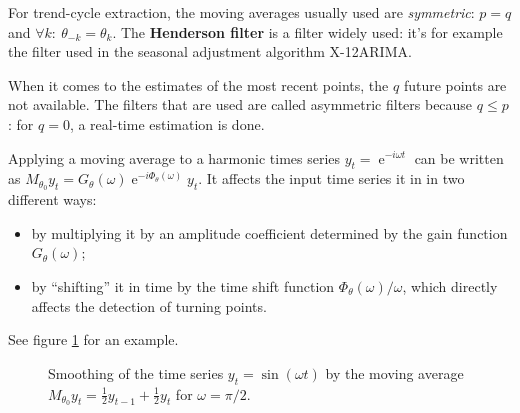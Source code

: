 \documentclass[12pt,,a4paper]{article}
\DeclareMathOperator{\e}{e}
\begin{document}
For trend-cycle extraction, the moving averages usually used are \emph{symmetric}: \(p=q\) and \(\forall k:\:\theta_{-k} = \theta_k\).
The \textbf{Henderson filter} is a filter widely used: it's for example the filter used in the seasonal adjustment algorithm X-12ARIMA.

When it comes to the estimates of the most recent points, the \(q\) future points are not available.
The filters that are used are called asymmetric filters because \(q\leq p\): for \(q=0\), a real-time estimation is done.

Applying a moving average to a harmonic times series \(y_t=\e^{-i\omega t}\) can be written as \(M_{\theta_0}y_t=G_\theta(\omega)\e^{-i\Phi_\theta(\omega)}y_t\). It affects the input time series it in in two different ways:

\begin{itemize}
\item
  by multiplying it by an amplitude coefficient determined by the gain function \(G_{\theta}\left(\omega\right)\);
\item
  by ``shifting'' it in time by the time shift function \(\Phi_\theta(\omega)/\omega\), which directly affects the detection of turning points.
\end{itemize}

See figure \ref{fig:exgainPhase} for an example.

\begin{figure}[!ht]
\caption{Smoothing of the time series $y_t=\sin(\omega t)$ by the moving average $M_{\theta_0}y_t=\frac{1}{2}y_{t-1}+\frac{1}{2}y_{t}$ for $\omega=\pi/2$.}\label{fig:exgainPhase}
\end{figure}
\end{document}
